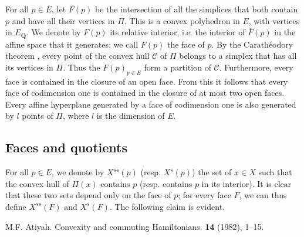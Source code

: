 \documentclass{article}
\newcommand{\QQ}{\mathbf{Q}}
\begin{document}
For all $p\in E$, let $\overline{F}(p)$ be the intersection of all the simplices that both contain $p$ and have all their vertices in $\Pi$.
This is a convex polyhedron in $E$, with vertices in $E_\QQ$.
We denote by $F(p)$ its relative interior, i.e. the interior of $\overline{F}(p)$ in the affine space that it generates;
we call $F(p)$ the face of $p$.
By the Carath\'{e}odory theorem \cite[Theorem~1.21]{Val}, every point of the convex hull $\mathcal{C}$ of $\Pi$ belongs to a simplex that has all its vertices in $\Pi$.
Thus the $F(p)_{p\in E}$ form a partition of $\mathcal{C}$.
Furthermore, every face is contained in the closure of an open face.
From this it follows that every face of codimension one is contained in the closure of at most two open faces.
Every affine hyperplane generated by a face of codimension one is also generated by $l$ points of $\Pi$, where $l$ is the dimension of $E$.


\subsection{Faces and quotients}
\label{1.2}

For all $p\in E$, we denote by $X^{ss}(p)$ (resp. $X^s(p)$) the set of $x\in X$ such that the convex hull of $\Pi(x)$ contains $p$ (resp. contains $p$ in its interior).
It is clear that these two sets depend only on the face of $p$;
for every face $F$, we can thus define $X^{ss}(F)$ and $X^s(F)$.
The following claim is evident.



\nocite{*}


\begin{thebibliography}{10}

  {\sc M.F. Atiyah.}
  \newblock Convexity and commuting Hamiltonians.
   \textbf{14} (1982), 1--15.

\end{thebibliography}
\end{document}
